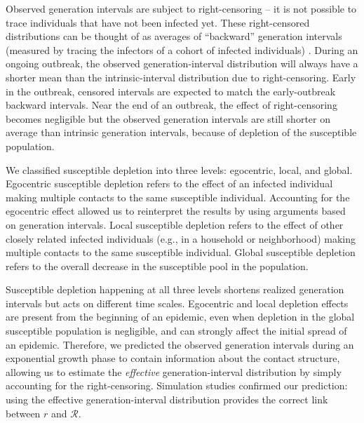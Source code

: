\documentclass[12pt]{article}
\newcommand{\RR}{\ensuremath{{\mathcal R}}}
\begin{document}
Observed generation intervals are subject to right-censoring -- it is not possible to trace individuals that have not been infected yet.
These right-censored distributions can be thought of as averages of ``backward'' generation intervals (measured by tracing the infectors of a cohort of infected individuals) \citep{kenah2008generation, nishiura2010time, tomba2010some, champredon2015intrinsic, britton2019estimation}.
During an ongoing outbreak, the observed generation-interval distribution will always have a shorter mean than the intrinsic-interval distribution due to right-censoring.
Early in the outbreak, censored intervals are expected to match the early-outbreak backward intervals.
Near the end of an outbreak, the effect of right-censoring becomes negligible but the observed generation intervals are still shorter on average than intrinsic generation intervals, because of depletion of the susceptible population.

We classified susceptible depletion into three levels: egocentric, local, and global.
Egocentric susceptible depletion refers to the effect of an infected individual making multiple contacts to the same susceptible individual.
Accounting for the egocentric effect allowed us to reinterpret the results by \cite{trapman2016inferring} using arguments based on generation intervals.
Local susceptible depletion refers to the effect of other closely related infected individuals (e.g., in a household or neighborhood) making multiple contacts to the same susceptible individual.
Global susceptible depletion refers to the overall decrease in the susceptible pool in the population.

Susceptible depletion happening at all three levels shortens realized generation intervals but acts on different time scales.
Egocentric and local depletion effects are present from the beginning of an epidemic, even when depletion in the global susceptible population is negligible, and can strongly affect the initial spread of an epidemic.
Therefore, we predicted the observed generation intervals during an exponential growth phase to contain information about the contact structure, allowing us to estimate the \emph{effective} generation-interval distribution by simply accounting for the right-censoring.
Simulation studies confirmed our prediction: using the effective generation-interval distribution provides the correct link between $r$ and $\RR$.
\end{document}
